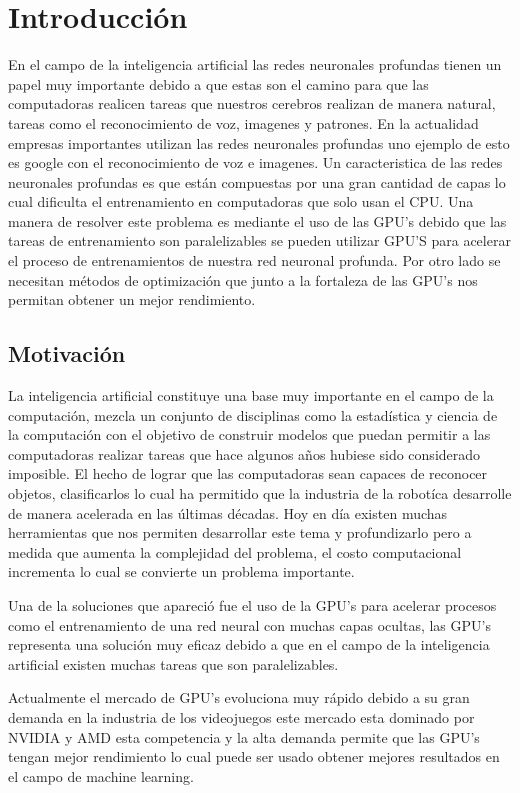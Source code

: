 \chapter{Introducción}
En el campo de la inteligencia artificial las redes neuronales profundas tienen un papel muy importante debido a que estas son el camino para que las computadoras realicen tareas que nuestros cerebros realizan de manera natural, tareas como el reconocimiento de voz, imagenes y patrones. En la actualidad empresas importantes utilizan las redes neuronales profundas uno ejemplo de esto es google con el reconocimiento de voz e imagenes. Un caracteristica de las redes neuronales profundas es que están compuestas por una gran cantidad de capas lo cual dificulta el entrenamiento en computadoras que solo usan el CPU. Una manera de resolver este problema es mediante el uso de las GPU's debido que las tareas de entrenamiento son paralelizables se pueden utilizar GPU'S para acelerar el proceso de entrenamientos de nuestra red neuronal profunda. Por otro lado se necesitan métodos de optimización que junto a la fortaleza de las GPU's nos permitan obtener un mejor rendimiento.

\section{Motivación}
La inteligencia artificial constituye una base muy importante en el campo de la computación, mezcla un conjunto de disciplinas como la estadística y ciencia de la computación con el objetivo de construir modelos que puedan permitir a las computadoras realizar tareas que hace algunos años hubiese sido considerado imposible. El hecho de lograr que las computadoras sean capaces de reconocer objetos, clasificarlos lo cual ha permitido que la industria de la robotíca desarrolle de manera acelerada en las últimas décadas.  Hoy en día existen muchas herramientas que nos permiten desarrollar este tema y profundizarlo pero a medida que aumenta la complejidad del problema, el costo computacional incrementa lo cual se convierte un problema importante.

 Una de la soluciones que apareció fue el uso de la GPU's para acelerar procesos como el entrenamiento de una red neural con muchas capas ocultas, las GPU's representa una solución muy eficaz debido a que en el campo de la inteligencia artificial existen muchas tareas que son paralelizables.

Actualmente el mercado de GPU's evoluciona muy rápido debido a su gran demanda en la industria de los videojuegos este mercado esta dominado por NVIDIA y AMD esta competencia y la alta demanda permite que las GPU's tengan mejor rendimiento lo cual puede ser usado obtener mejores resultados en el campo de machine learning. 

